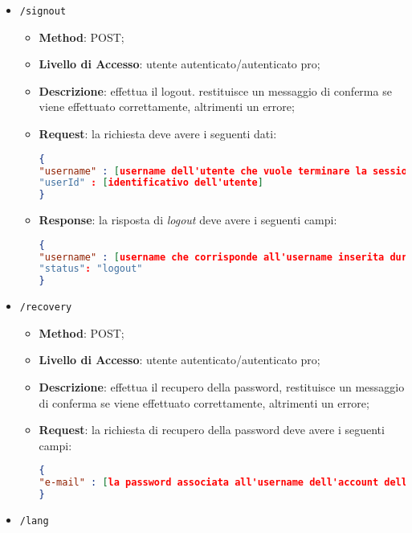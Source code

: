 \begin{itemize}
\begin{itemize}
\begin{lstlisting}[language=json,firstnumber=1]
{
"_userId" : [identificativo dell'utente]
"username" : [username che corrisponde all'username inserita durante la registrazione]
}
\end{lstlisting}
		\end{itemize}
	\item \texttt{/signout}
		\begin{itemize}
			\item \textbf{Method}: POST;
			\item \textbf{Livello di Accesso}: utente autenticato/autenticato pro;
			\item \textbf{Descrizione}: effettua il logout. restituisce un messaggio di conferma se viene effettuato correttamente, altrimenti un errore;
			\item \textbf{Request}: la richiesta deve avere i seguenti dati:
\begin{lstlisting}[language=json,firstnumber=1]
{
"username" : [username dell'utente che vuole terminare la sessione]
"userId" : [identificativo dell'utente]
}
\end{lstlisting}
			\item \textbf{Response}: la risposta di \textit{logout} deve avere i seguenti campi:
\begin{lstlisting}[language=json,firstnumber=1]
{
"username" : [username che corrisponde all'username inserita durante la registrazione]
"status": "logout"
}
\end{lstlisting}
		\end{itemize}
	\item \texttt{/recovery}
		\begin{itemize}
			\item \textbf{Method}: POST;
			\item \textbf{Livello di Accesso}: utente autenticato/autenticato pro;
			\item \textbf{Descrizione}: effettua il recupero della password, restituisce un messaggio di conferma se viene effettuato correttamente, altrimenti un errore;
			\item \textbf{Request}: la richiesta di recupero della password deve avere i seguenti campi:
\begin{lstlisting}[language=json,firstnumber=1]
{
"e-mail" : [la password associata all'username dell'account dell'utente]
}
\end{lstlisting}
		\end{itemize}
	\item \texttt{/lang}

\end{itemize}
